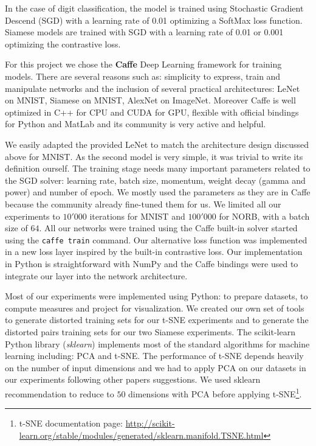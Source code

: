 \documentclass[a4paper,12pt]{report}
\begin{document}
In the case of digit classification, the model is trained using Stochastic Gradient Descend (SGD) with a learning rate of 0.01 optimizing a SoftMax loss function.
Siamese models are trained with SGD with a learning rate of 0.01 or 0.001 optimizing the contrastive loss.

For this project we chose the {\bf Caffe} Deep Learning framework for training models.
There are several reasons such as: simplicity to express, train and manipulate networks and the inclusion of several practical architectures: LeNet on MNIST, Siamese on MNIST, AlexNet on ImageNet.
Moreover Caffe is well optimized in C++ for CPU and CUDA for GPU, flexible with official bindings for Python and MatLab and its community is very active and helpful.

We easily adapted the provided LeNet to match the architecture design discussed above for MNIST.
As the second model is very simple, it was trivial to write its definition ourself.
The training stage needs many important parameters related to the SGD solver: learning rate, batch size, momentum, weight decay (gamma and power) and number of epoch.
We mostly used the parameters as they are in Caffe because the community already fine-tuned them for us.
We limited all our experiments to $10'000$ iterations for MNIST and $100'000$ for NORB, with a batch size of $64$.
All our networks were trained using the Caffe built-in solver started using the {\tt caffe train} command.
Our alternative loss function was implemented in a new loss layer inspired by the built-in contrastive loss.
Our implementation in Python is straightforward with NumPy and the Caffe bindings were used to integrate our layer into the network architecture.

Most of our experiments were implemented using Python: to prepare datasets, to compute measures and project for visualization.
We created our own set of tools to generate distorted training sets for our t-SNE experiments and to generate the distorted pairs training sets for our two Siamese experiments.
The scikit-learn Python library ({\em sklearn}) implements most of the standard algorithms for machine learning including: PCA and t-SNE\cite{pedregosa2011scikit}.
The performance of t-SNE depends heavily on the number of input dimensions and we had to apply PCA on our datasets in our experiments following other papers suggestions\cite{t-SNE}.
We used sklearn recommendation to reduce to $50$ dimensions with PCA before applying t-SNE\footnote{t-SNE documentation page: \url{http://scikit-learn.org/stable/modules/generated/sklearn.manifold.TSNE.html}}.
\end{document}

